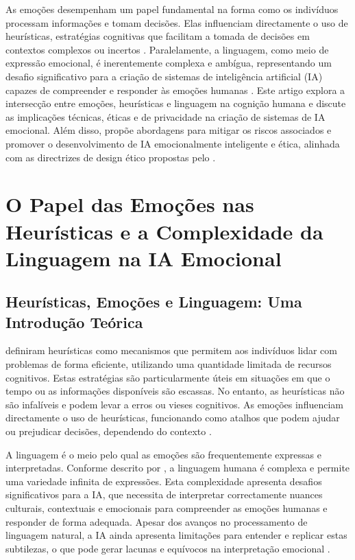 \documentclass[a4paper,12pt]{report}
\begin{document}
	As emoções desempenham um papel fundamental na forma como os indivíduos processam informações e tomam decisões. Elas influenciam directamente o uso de heurísticas, estratégias cognitivas que facilitam a tomada de decisões em contextos complexos ou incertos \parencite{kahneman1974}. Paralelamente, a linguagem, como meio de expressão emocional, é inerentemente complexa e ambígua, representando um desafio significativo para a criação de sistemas de inteligência artificial (IA) capazes de compreender e responder às emoções humanas \parencite{chomsky1965}. Este artigo explora a intersecção entre emoções, heurísticas e linguagem na cognição humana e discute as implicações técnicas, éticas e de privacidade na criação de sistemas de IA emocional. Além disso, propõe abordagens para mitigar os riscos associados e promover o desenvolvimento de IA emocionalmente inteligente e ética, alinhada com as directrizes de design ético propostas pelo \textcite{ieee2019}.
	
	\section{O Papel das Emoções nas Heurísticas e a Complexidade da Linguagem na IA Emocional}
	
	\subsection{Heurísticas, Emoções e Linguagem: Uma Introdução Teórica}
	
	\textcite{kahneman1974} definiram heurísticas como mecanismos que permitem aos indivíduos lidar com problemas de forma eficiente, utilizando uma quantidade limitada de recursos cognitivos. Estas estratégias são particularmente úteis em situações em que o tempo ou as informações disponíveis são escassas. No entanto, as heurísticas não são infalíveis e podem levar a erros ou vieses cognitivos. As emoções influenciam directamente o uso de heurísticas, funcionando como atalhos que podem ajudar ou prejudicar decisões, dependendo do contexto \parencite{slovic2007}.
	
	A linguagem é o meio pelo qual as emoções são frequentemente expressas e interpretadas. Conforme descrito por \textcite{chomsky1965}, a linguagem humana é complexa e permite uma variedade infinita de expressões. Esta complexidade apresenta desafios significativos para a IA, que necessita de interpretar correctamente nuances culturais, contextuais e emocionais para compreender as emoções humanas e responder de forma adequada. Apesar dos avanços no processamento de linguagem natural, a IA ainda apresenta limitações para entender e replicar estas subtilezas, o que pode gerar lacunas e equívocos na interpretação emocional \parencite{russell2020}.
	
\end{document}
